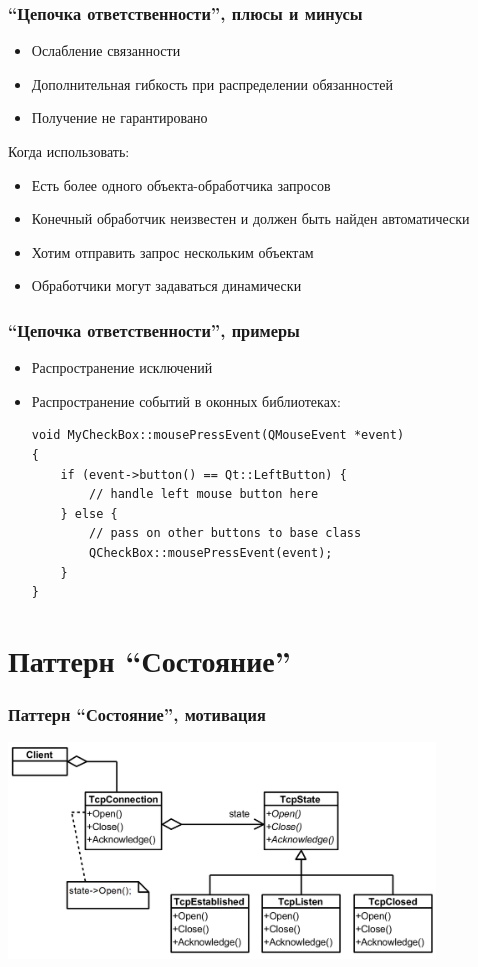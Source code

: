 \documentclass{../../slides-style}
\begin{document}
    \begin{frame}
        \frametitle{``Цепочка ответственности'', плюсы и минусы}
        \begin{itemize}
            \item Ослабление связанности
            \item Дополнительная гибкость при распределении обязанностей
            \item Получение не гарантировано
        \end{itemize}
        Когда использовать:
        \begin{itemize}
            \item Есть более одного объекта-обработчика запросов
            \item Конечный обработчик неизвестен и должен быть найден автоматически
            \item Хотим отправить запрос нескольким объектам
            \item Обработчики могут задаваться динамически
        \end{itemize}
    \end{frame}

    \begin{frame}[fragile]
        \frametitle{``Цепочка ответственности'', примеры}
        \begin{itemize}
            \item Распространение исключений
            \item Распространение событий в оконных библиотеках:
            \begin{verbatim}
void MyCheckBox::mousePressEvent(QMouseEvent *event)
{
    if (event->button() == Qt::LeftButton) {
        // handle left mouse button here
    } else {
        // pass on other buttons to base class
        QCheckBox::mousePressEvent(event);
    }
}
            \end{verbatim}
        \end{itemize}
    \end{frame}

    \section{Паттерн ``Состояние''}

    \begin{frame}
        \frametitle{Паттерн ``Состояние'', мотивация}
        \begin{center}
            \includegraphics[width=0.85\textwidth]{stateExample.png}
        \end{center}
    \end{frame}
\end{document}

